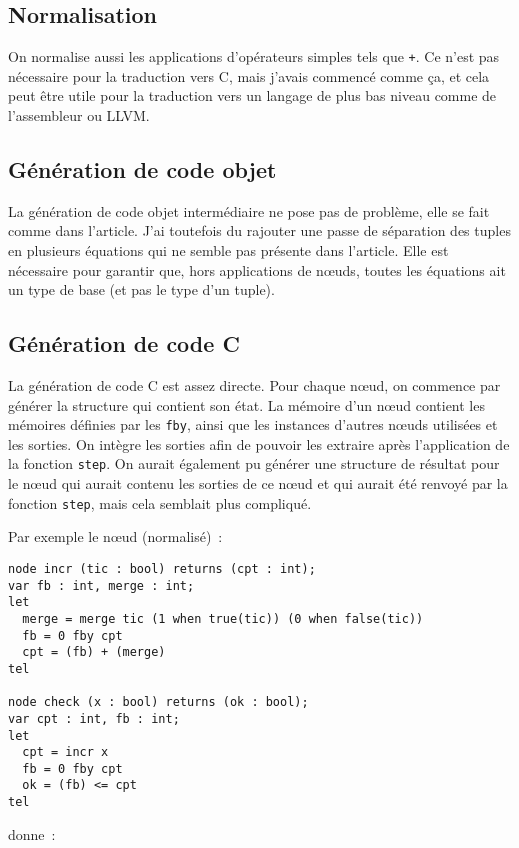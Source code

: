 \documentclass{article}
\begin{document}
\subsection{Normalisation}

On normalise aussi les applications d'opérateurs simples tels que \verb/+/. Ce
n'est pas nécessaire pour la traduction vers C, mais j'avais commencé comme ça,
et cela peut être utile pour la traduction vers un langage de plus bas niveau
comme de l'assembleur ou LLVM.

\subsection{Génération de code objet}

La génération de code objet intermédiaire ne pose pas de problème, elle se fait
comme dans l'article. J'ai toutefois du rajouter une passe de séparation des
tuples en plusieurs équations qui ne semble pas présente dans l'article. Elle
est nécessaire pour garantir que, hors applications de nœuds, toutes les
équations ait un type de base (et pas le type d'un tuple).

\subsection{Génération de code C}

La génération de code C est assez directe. Pour chaque nœud, on
commence par générer la structure qui contient son état. La mémoire d'un nœud
contient les mémoires définies par les \verb/fby/, ainsi que les instances
d'autres nœuds utilisées et les sorties. On intègre les sorties afin de pouvoir
les extraire après l'application de la fonction \verb/step/. On aurait également
pu générer une structure de résultat pour le nœud qui aurait contenu les sorties
de ce nœud et qui aurait été renvoyé par la fonction \verb+step+, mais cela
semblait plus compliqué.

Par exemple le nœud (normalisé)~:

\begin{verbatim}
node incr (tic : bool) returns (cpt : int);
var fb : int, merge : int;
let
  merge = merge tic (1 when true(tic)) (0 when false(tic))
  fb = 0 fby cpt
  cpt = (fb) + (merge)
tel

node check (x : bool) returns (ok : bool);
var cpt : int, fb : int;
let
  cpt = incr x
  fb = 0 fby cpt
  ok = (fb) <= cpt
tel
\end{verbatim}

donne~:
\end{document}
